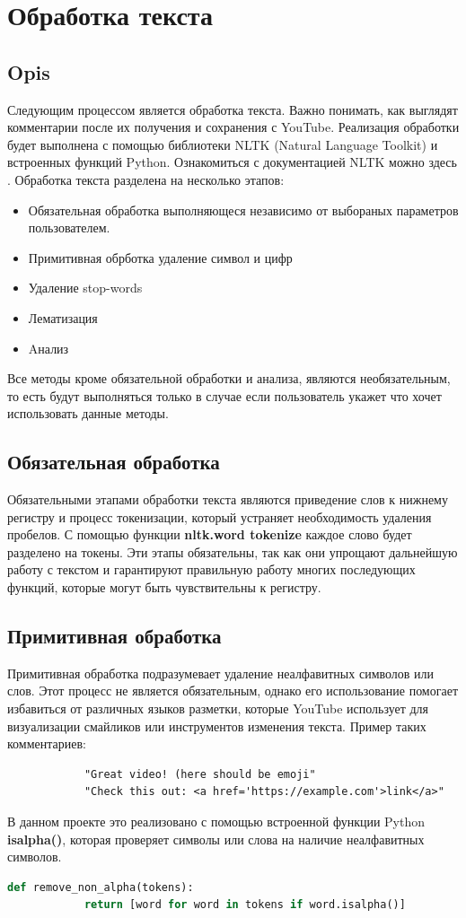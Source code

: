 \section{Обработка текста}

	\subsection{Opis}
		Следующим процессом является обработка текста. Важно понимать, как выглядят комментарии после их получения и сохранения с YouTube. Реализация обработки будет выполнена с помощью библиотеки NLTK (Natural Language Toolkit) и встроенных функций Python. Ознакомиться с документацией NLTK можно здесь \cite{nltk}. Обработка текста разделена на несколько этапов:
		\begin{itemize}
			\item Обязательная обработка выполняющеся независимо от выбораных параметров пользователем.
			\item Примитивная обрботка удаление символ  и цифр
			\item Удаление stop-words
			\item Лематизация
			\item Aнализ
		\end{itemize}
		Все методы кроме обязательной обработки и анализа, являются необязательным, то есть будут выполняться только в случае если пользователь укажет что хочет использовать данные методы.
		
	\subsection{Обязательная обработка}
		Обязательными этапами обработки текста являются приведение слов к нижнему регистру и процесс токенизации, который устраняет необходимость удаления пробелов. С помощью функции \textbf{nltk.word tokenize} каждое слово будет разделено на токены. Эти этапы обязательны, так как они упрощают дальнейшую работу с текстом и гарантируют правильную работу многих последующих функций, которые могут быть чувствительны к регистру.
		
	\subsection{Примитивная обработка}
		Примитивная обработка подразумевает удаление неалфавитных символов или слов. Этот процесс не является обязательным, однако его использование помогает избавиться от различных языков разметки, которые YouTube использует для визуализации смайликов или инструментов изменения текста. 
		Пример таких комментариев:
		\begin{verbatim}
			"Great video! (here should be emoji"
			"Check this out: <a href='https://example.com'>link</a>"
		\end{verbatim}
		В данном проекте это реализовано с помощью встроенной функции Python \textbf{isalpha()}, которая проверяет символы или слова на наличие неалфавитных символов.
		\begin{lstlisting}[language=Python]
			def remove_non_alpha(tokens):
			return [word for word in tokens if word.isalpha()]
		\end{lstlisting}
		
